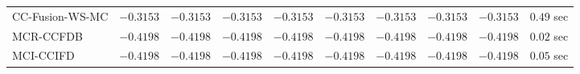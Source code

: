 \begin{table}[H]
\begin{tabular}{lrrrrrrrrr}
     CC-Fusion-WS-MC & $      -0.3153$ & $      -0.3153$ & $      -0.3153$ & $      -0.3153$ & $      -0.3153$ & $      -0.3153$ & $      -0.3153$ & $      -0.3153$ & $         0.49$ sec   \\ 
\cmidrule{1-1} 
           MCR-CCFDB & $      -0.4198$ & $      -0.4198$ & $      -0.4198$ & $      -0.4198$ & $      -0.4198$ & $      -0.4198$ & $      -0.4198$ & $      -0.4198$ & $         0.02$ sec   \\ 
\cmidrule{1-1} 
           MCI-CCIFD & $      -0.4198$ & $      -0.4198$ & $      -0.4198$ & $      -0.4198$ & $      -0.4198$ & $      -0.4198$ & $      -0.4198$ & $      -0.4198$ & $         0.05$ sec   \\ 
\bottomrule
\end{tabular}
\end{table}

